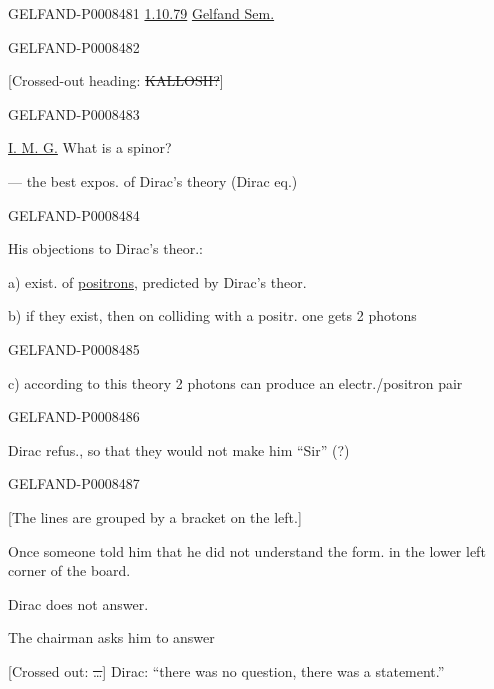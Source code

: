 \begin{GelfandAdjacentEvidence}{GELFAND-P000848}{1}
\uline{1.10.79} \qquad \uline{Gelfand Sem.}
\end{GelfandAdjacentEvidence}
\begin{GelfandAdjacentEvidence}{GELFAND-P000848}{2}


[Crossed-out heading: \sout{KALLOSH?}]
\end{GelfandAdjacentEvidence}
\begin{GelfandAdjacentEvidence}{GELFAND-P000848}{3}


\uline{I. M. G.} What is a spinor?

 — the best expos. of Dirac’s theory (Dirac eq.)
\end{GelfandAdjacentEvidence}
\begin{GelfandAdjacentEvidence}{GELFAND-P000848}{4}


His objections to Dirac’s theor.:

a) exist. of \uline{positrons}, predicted by Dirac’s theor.

b) if they exist, then on colliding with a positr. one gets 2 photons
\end{GelfandAdjacentEvidence}
\begin{GelfandAdjacentEvidence}{GELFAND-P000848}{5}


c) according to this theory 2 photons can produce an electr./positron pair
\end{GelfandAdjacentEvidence}
\begin{GelfandAdjacentEvidence}{GELFAND-P000848}{6}


Dirac refus., so that they would not make him “Sir” (?)
\end{GelfandAdjacentEvidence}
\begin{GelfandAdjacentEvidence}{GELFAND-P000848}{7}


[The lines are grouped by a bracket on the left.]

Once someone told him that he did not understand the form. in the lower left corner of the board.

Dirac does not answer.

The chairman asks him to answer

[Crossed out: \sout{…}] Dirac: “there was no question, there was a statement.”
\end{GelfandAdjacentEvidence}
